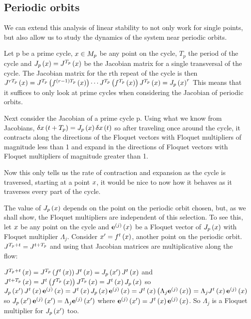 \subsection{Periodic orbits}{

We can extend this analysis of linear stability to not only work for single points, but also allow us to study the dynamics of the system near periodic orbits.



Let p be a prime cycle, $\ssp \in M_p$ be any point on the cycle, $T_p$ the period of the cycle and
$\jMps_p\left(\ssp\right) = \jMps^{T_p}\left(\ssp\right)$ be the Jacobian matrix for a single transversal of the cycle. The Jacobian matrix for the rth repeat of the cycle is then $\jMps^{r T_p}\left(\ssp\right)=\jMps^{T_p}\left(f^{\left(r-1\right) T_p}\left(\ssp\right)\right) \cdots \jMps^{T_p}\left(f^{T_p}\left(\ssp\right)\right)\jMps^{T_p}\left(\ssp\right)=\jMps_p\left(\ssp\right)^r$
This means that it suffices to only look at prime cycles when considering the Jacobian of periodic orbits.

Next consider the Jacobian of a prime cycle p.
Using what we know from Jacobians, $\delta \ssp \left(t+T_p\right)=\jMps_p\left(\ssp\right)\delta \ssp\left(t\right)$ so after traveling once around the cycle, it contracts along the directions of the Floquet vectors with Floquet multipliers of magnitude less than 1 and expand in the directions of Floquet vectors with Floquet multipliers of magnitude greater than 1.

Now this only tells us the rate of contraction and expansion as the cycle is traversed, starting at a point $\ssp$, it would be nice to now how it behaves as it traverses every part of the cycle.

The value of $\jMps_p\left(\ssp\right)$ depends on the point on the periodic orbit chosen, but, as we shall show, the Floquet multipliers are independent of this selection. To see this, let $\ssp$ be any point on the cycle and $\jEigvec[j]\left(\ssp\right)$ be a Floquet vector of $\jMps_p\left(\ssp\right)$ with Floquet multiplier
$\Lambda_j$. Consider $\ssp'=f^t\left(\ssp\right)$, another point on the periodic orbit. $\jMps^{T_p +t}=\jMps^{t+T_p}$ and using that Jacobian matrices are multiplicative along the flow:

$\jMps^{T_p +t}\left(\ssp\right)=\jMps^{T_p}\left(f^t\left(\ssp\right)\right)\jMps^t\left(\ssp\right)=\jMps_p\left(\ssp'\right)\jMps^t\left(\ssp\right)$
and $\jMps^{t+T_p}\left(\ssp\right)=\jMps^t\left(f^{T_p}\left(\ssp\right)\right)\jMps^{T_p}\left(\ssp\right)=\jMps^t\left(\ssp\right)\jMps_p\left(\ssp\right)$
so $\jMps_p\left(\ssp'\right)\jMps^t\left(\ssp\right)\jEigvec[j]\left(\ssp\right)=\jMps^t\left(\ssp\right)\jMps_p\left(\ssp\right)\jEigvec[j]\left(\ssp\right)=\jMps^t\left(\ssp\right) \left(\Lambda_j \jEigvec[j]\left(\ssp\right)\right)=\Lambda_j \jMps^t\left(\ssp\right) \jEigvec[j]\left(\ssp\right)$ so $\jMps_p\left(\ssp'\right) \jEigvec[j]\left(\ssp'\right)=\Lambda_j \jEigvec[j]\left(\ssp'\right)$
where $\jEigvec[j]\left(\ssp'\right)=\jMps^t\left(\ssp\right)\jEigvec[j]\left(\ssp\right)$. So $\Lambda_j$ is a Floquet multiplier for $\jMps_p\left(\ssp'\right)$ too.



}
